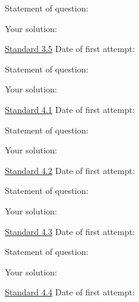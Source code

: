 \documentclass[12pt]{article}
\begin{document}
\bigskip

Statement of question:

\vspace{1in}

Your solution:

\newpage


\underline{Standard 3.5} \hspace{6cm} Date of first attempt:



\bigskip

Statement of question:

\vspace{1in}

Your solution:

\newpage


\underline{Standard 4.1} \hspace{6cm} Date of first attempt:



\bigskip

Statement of question:

\vspace{1in}

Your solution:

\newpage


\underline{Standard 4.2} \hspace{6cm} Date of first attempt:



\bigskip

Statement of question:

\vspace{1in}

Your solution:

\newpage


\underline{Standard 4.3} \hspace{6cm} Date of first attempt:



\bigskip

Statement of question:

\vspace{1in}

Your solution:

\newpage


\underline{Standard 4.4} \hspace{6cm} Date of first attempt:
\end{document}
